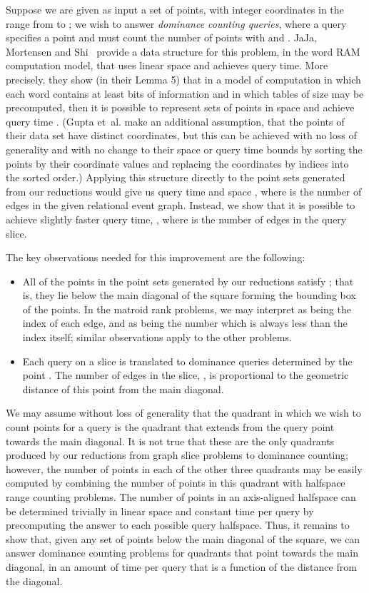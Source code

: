 \documentclass[11pt]{article}
\begin{document}
Suppose we are given as input a set  of  points, with integer coordinates in the range from  to ; we wish to answer \emph{dominance counting queries}, where a query specifies a point  and must count the number of points  with  and .
JaJa, Mortensen and Shi~\cite{JaJMorShi-ISAAC-04} provide a data structure for this problem, in the word RAM computation model, that uses linear space and achieves  query time. More precisely, they show (in their Lemma 5) that in a model of computation in which each word contains at least  bits of information and in which tables of size  may be precomputed,
then it is possible to represent sets of  points in space  and achieve query time . (Gupta et~al.{} make an additional assumption, that the points of their data set have distinct coordinates, but this can be achieved with no loss of generality and with no change to their space or query time bounds by sorting the points by their coordinate values and replacing the coordinates by indices into the sorted order.)
Applying this structure directly to the point sets generated from our reductions would give us query time  and space , where  is the number of edges in the given relational event graph. Instead, we show that it is possible to achieve slightly faster query time, , where  is the number of edges in the query slice.

The key observations needed for this improvement are the following:
\begin{itemize}
\item
All of the points  in the point sets generated by our reductions satisfy ; that is, they lie below the main diagonal  of the  square forming the bounding box of the points.
In the matroid rank problems, we may interpret  as being the index of each edge, and  as being the number  which is always less than the index itself; similar observations apply to the other problems.
\item
Each query on a slice  is translated to dominance queries determined by the point . The number of edges in the slice, , is proportional to the geometric distance  of this point from the main diagonal.
\end{itemize}

We may assume without loss of generality that the quadrant in which we wish to count points for a query  is the quadrant  that extends from the query point towards the main diagonal. It is not true that these are the only quadrants produced by our reductions from graph slice problems to dominance counting; however, the number of points in each of the other three quadrants may be easily computed by combining the number of points in this quadrant with halfspace range counting problems. The number of points in an axis-aligned halfspace can be determined trivially in linear space and constant time per query by precomputing the answer to each possible query halfspace.
Thus, it remains to show that, given any set of points below the main diagonal of the square, we can answer dominance counting problems for quadrants that point towards the main diagonal, in an amount of time per query that is a function of the distance from the diagonal.
\end{document}
